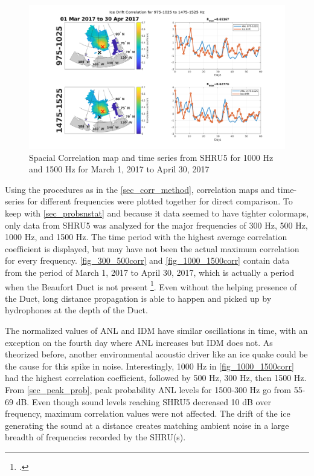 \begin{figure}[p]
\centering
\includegraphics[scale=0.35]{Figures/1000_1500_spatial_corr_20170301-20170430.png}
\caption{Spacial Correlation map and time series from SHRU5 for 1000 Hz and 1500 Hz for March 1, 2017 to April 30, 2017}
\label{fig_1000_1500corr}
\end{figure}

Using the procedures as in the \autoref{sec_corr_method}, correlation maps and time-series for different frequencies were plotted together for direct comparison. To keep with \autoref{sec_probsnstat} and because it data seemed to have tighter colormaps, only data from SHRU5 was analyzed for the major frequencies of 300 Hz, 500 Hz, 1000 Hz, and 1500 Hz. The time period with the highest average correlation coefficient is displayed, but may have not been the actual maximum correlation for every frequency. \autoref{fig_300_500corr} and \autoref{fig_1000_1500corr} contain data from the period of March 1, 2017 to April 30, 2017, which is actually a period when the Beaufort Duct is not present \footcite[]{ballard2020yearlong}. Even without the helping presence of the Duct, long distance propagation is able to happen and picked up by hydrophones at the depth of the Duct. 

The normalized values of ANL and IDM have similar oscillations in time, with an exception on the fourth day where ANL increases but IDM does not. As theorized before, another environmental acoustic driver like an ice quake could be the cause for this spike in noise. Interestingly, 1000 Hz in \autoref{fig_1000_1500corr} had the highest correlation coefficient, followed by 500 Hz, 300 Hz, then 1500 Hz. From \autoref{sec_peak_prob}, peak probability ANL levels for 1500-300 Hz go from 55-69 dB. Even though sound levels reaching SHRU5 decreased 10 dB over frequency, maximum correlation values were not affected. The drift of the ice generating the sound at a distance creates matching ambient noise in a large breadth of frequencies recorded by the SHRU(s). 

